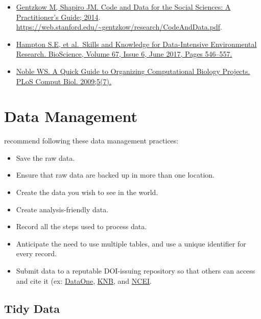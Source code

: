 \documentclass[
]{book}
\providecommand{\tightlist}{%
  \setlength{\itemsep}{0pt}\setlength{\parskip}{0pt}}
\begin{document}
\begin{itemize}
\tightlist
\item
  \href{https://web.stanford.edu/~gentzkow/research/CodeAndData.pdf}{Gentzkow M, Shapiro JM. Code and Data for the Social Sciences: A Practitioner's Guide; 2014}. \url{https://web.stanford.edu/~gentzkow/research/CodeAndData.pdf}.
\item
  \href{https://academic.oup.com/bioscience/article/67/6/546/3784601}{Hampton S.E, et al.~Skills and Knowledge for Data-Intensive Environmental Research. BioScience, Volume 67, Issue 6, June 2017, Pages 546--557.}
\item
  \href{https://journals.plos.org/ploscompbiol/article?id=10.1371/journal.pcbi.1000424}{Noble WS. A Quick Guide to Organizing Computational Biology Projects. PLoS Comput Biol. 2009;5(7).}
\end{itemize}

\hypertarget{data-management}{%
\section{Data Management}\label{data-management}}

\citet{Wilson_2017} recommend following these data management practices:

\begin{itemize}
\tightlist
\item
  Save the raw data.
\item
  Ensure that raw data are backed up in more than one location.
\item
  Create the data you wish to see in the world.
\item
  Create analysis-friendly data.
\item
  Record all the steps used to process data.
\item
  Anticipate the need to use multiple tables, and use a unique identifier for every record.
\item
  Submit data to a reputable DOI-issuing repository so that others can access and cite it (ex: \href{https://www.dataone.org/}{DataOne}, \href{https://knb.ecoinformatics.org/}{KNB}, and \href{https://www.ncei.noaa.gov/access/search/index}{NCEI}.
\end{itemize}

\hypertarget{tidy-data}{%
\subsection{Tidy Data}\label{tidy-data}}
\end{document}
